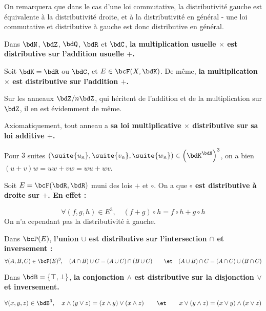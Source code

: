 \documentclass[a4paper,french,bookmarks]{article}
\begin{document}
On remarquera que dans le cas d'une loi commutative, la distributivité gauche est équivalente à la distributivité droite, et à la distributivité en général - une loi commutative et distributive à gauche est donc distributive en général.

\begin{example}{}{}
    \begin{enumerate}
        \ithand Dans $\bdN$, $\bdZ$, $\bdQ$, $\bdR$ et $\bdC$, \bf{la multiplication usuelle $\times$ est distributive sur l'addition usuelle $+$}.
        
        \ithand Soit $\bdK = \bdR$ ou $\bdC$, et $E \in \bcF(X, \bdK)$. De même, \bf{la multiplication $\times$ est distributive sur l'addition $+$}.
        
        \ithand Sur les anneaux $\bdZ/n\bdZ$, qui héritent de l'addition et de la multiplication sur $\bdZ$, il en est évidemment de même.
        
        \ithand Axiomatiquement, tout anneau a \bf{sa loi multiplicative $\times$ distributive sur sa loi additive $+$}.
        
        Pour $3$ suites $\left(\suite{u_n}, \suite{v_n}, \suite{w_n}\right) \in \left(\bdK^\bdN\right)^3$, on a bien $(u + v)w = uw + vw = wu + wv$.
        
        \ithand Soit $E = \bcF(\bdR, \bdR)$ muni des lois $+$ et $\circ$. On a que \bf{$\circ$ est distributive à droite sur $+$}. En effet :
        
        \[ \forall (f, g, h) \in E^3,\quad (f+g)\circ h = f \circ h + g \circ h\]
        On n'a cependant pas la distributivité à gauche.
        
        \ithand Dans $\bcP(E)$, \bf{l'union $\cup$ est distributive sur l'intersection $\cap$ et inversement} :
        \[ \forall (A, B, C) \in \bcP(E)^3, \quad (A \cap B) \cup C = (A \cup C) \cap (B \cup C) \qquad\et\quad (A \cup B) \cap C = (A \cap C) \cup (B \cap C)\]
        
        \ithand Dans $\bdB = \{\top ,\perp \}$, \bf{la conjonction $\land$} \bf{est distributive sur la disjonction $\lor$} \bf{et inversement}.
        
        \[ \forall (x, y, z) \in \bdB^3,\quad x \land (y \lor z) = (x \land y) \lor (x \land z) \qquad\et\qquad x\lor(y\land z) = (x \lor y)\land(x \lor z)\]
        
    \end{enumerate}
\end{example}
    
\end{document}
